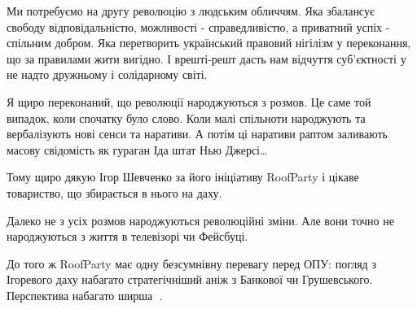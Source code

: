 Ми потребуємо на другу революцію з людським обличчям. Яка збалансує свободу
відповідальністю, можливості - справедливістю, а приватний успіх - спільним
добром. Яка перетворить український правовий нігілізм у переконання, що за
правилами жити вигідно. І врешті-решт дасть нам відчуття суб’єктності у не
надто дружньому і солідарному світі. 

Я щиро переконаний, що революції народжуються з розмов. Це саме той випадок,
коли спочатку було слово. Коли малі спільноти народжують та вербалізують нові
сенси та наративи. А потім ці наративи раптом заливають масову свідомість як
гураган Іда штат Нью Джерсі…

Тому щиро дякую Ігор Шевченко за його ініціативу RoofParty і цікаве товариство,
що збирається в нього на даху.

Далеко не з усіх розмов народжуються революційні зміни. Але вони точно не
народжуються з життя в телевізорі чи Фейсбуці. 

До того ж RoofParty має одну безсумнівну перевагу перед ОПУ: погляд з Ігоревого
даху набагато стратегічніший аніж з Банкової чи Грушевського. Перспектива
набагато ширша 🙂.

